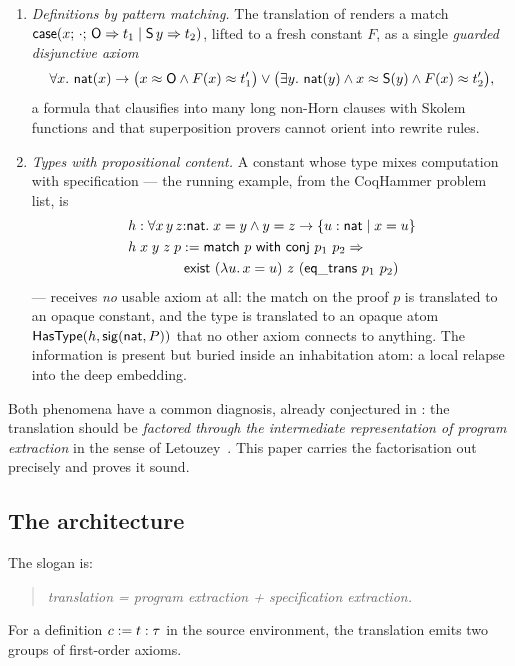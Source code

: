 \begin{enumerate}[leftmargin=2em]
\item \emph{Definitions by pattern matching.}  The translation of
  \cite{CzajkaKaliszyk2018} renders a match
  $\mathsf{case}(x;\,\cdot;\,\mathsf{O} \Rightarrow t_1 \mid \mathsf{S}\,y \Rightarrow t_2)$,
  lifted to a fresh constant $F$, as a single \emph{guarded disjunctive
  axiom}
  \[
    \forall x.\ \mathsf{nat}(x) \to
      \bigl(x \approx \mathsf{O} \wedge F(x) \approx t_1'\bigr) \vee
      \bigl(\exists y.\ \mathsf{nat}(y) \wedge x \approx \mathsf{S}(y) \wedge F(x) \approx t_2'\bigr),
  \]
  a formula that clausifies into many long non-Horn clauses with Skolem
  functions and that superposition provers cannot orient into rewrite
  rules.
\item \emph{Types with propositional content.}  A constant whose type
  mixes computation with specification --- the running example, from the
  CoqHammer problem list, is
  \begin{align*}
    &h : \forall x\,y\,z{:}\nat.\; x = y \wedge y = z \to
      \{u : \nat \mid x = u\}\\
    &h\;x\;y\;z\;p \defeq
      \mathsf{match}\ p\ \mathsf{with}\ \mathsf{conj}\ p_1\ p_2
      \Rightarrow{}\\
    &\qquad\qquad
      \mathsf{exist}\ (\lambda u.\, x = u)\ z\ (\mathsf{eq\_trans}\ p_1\ p_2)
  \end{align*}
  --- receives \emph{no} usable axiom at all: the match on the proof $p$ is
  translated to an opaque constant, and the type is translated to an opaque
  atom $\mathsf{HasType}(h, \mathsf{sig}(\mathsf{nat}, P))$ that no other axiom
  connects to anything.  The information is present but buried inside an
  inhabitation atom: a local relapse into the deep embedding.
\end{enumerate}

Both phenomena have a common diagnosis, already conjectured in
\cite[\S 9]{CzajkaKaliszyk2018}: the translation should be \emph{factored
through the intermediate representation of program extraction} in the sense
of Letouzey~\cite{Letouzey2004,Letouzey2003,Letouzey2008}.  This paper
carries the factorisation out precisely and proves it sound.

\subsection{The architecture}
\label{sec:intro-arch}

The slogan is:
\begin{quote}
  \emph{translation = program extraction + specification extraction.}
\end{quote}
For a definition $c \mathrel{:=} t : \tau$ in the source environment, the
translation emits two groups of first-order axioms.

